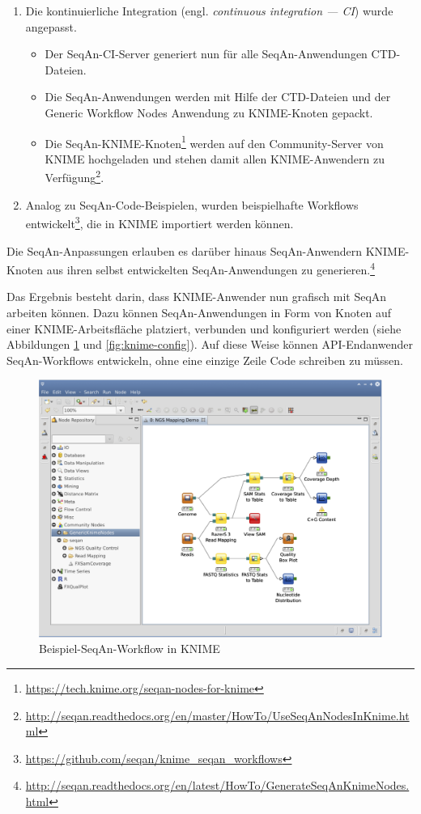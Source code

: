 \begin{enumerate}
\begin{enumerate}
\begin{itemize}
    \end{itemize}
    \item[2.] Die kontinuierliche Integration (engl. \textit{continuous integration --- CI}) wurde angepasst.
    \begin{itemize}
      \item Der SeqAn-CI-Server generiert nun für alle SeqAn-Anwendungen CTD-Dateien.
      \item Die SeqAn-Anwendungen werden mit Hilfe der CTD-Dateien und der Generic Workflow Nodes Anwendung zu KNIME-Knoten gepackt.
      \item Die SeqAn-KNIME-Knoten\footnote{\url{https://tech.knime.org/seqan-nodes-for-knime}} werden auf den Community-Server von KNIME hochgeladen und stehen damit allen KNIME-Anwendern zu Verfügung\footnote{\url{http://seqan.readthedocs.org/en/master/HowTo/UseSeqAnNodesInKnime.html}}.
    \end{itemize}
    \item[3.] Analog zu SeqAn-Code-Beispielen, wurden beispielhafte Workflows entwickelt\footnote{\url{https://github.com/seqan/knime_seqan_workflows}}, die in KNIME importiert werden können.
  \end{enumerate}
\end{enumerate}

Die SeqAn-Anpassungen erlauben es darüber hinaus SeqAn-Anwendern KNIME-Knoten aus ihren selbst entwickelten SeqAn-Anwendungen zu generieren.\footnote{\url{http://seqan.readthedocs.org/en/latest/HowTo/GenerateSeqAnKnimeNodes.html}}

Das Ergebnis besteht darin, dass KNIME-Anwender nun grafisch mit SeqAn arbeiten können. Dazu können SeqAn-Anwendungen in Form von Knoten auf einer KNIME-Arbeitsfläche platziert, verbunden und konfiguriert werden (siehe Abbildungen \ref{fig:knime-example} und \ref{fig:knime-config}). Auf diese Weise können API-Endanwender SeqAn-Workflows entwickeln, ohne eine einzige Zeile Code schreiben zu müssen.

\begin{figure}
  \centering
    \includegraphics[width=1\linewidth]{Figures/knime-example.png}
  \caption{Beispiel-SeqAn-Workflow in KNIME}
  \label{fig:knime-example}
\end{figure}

